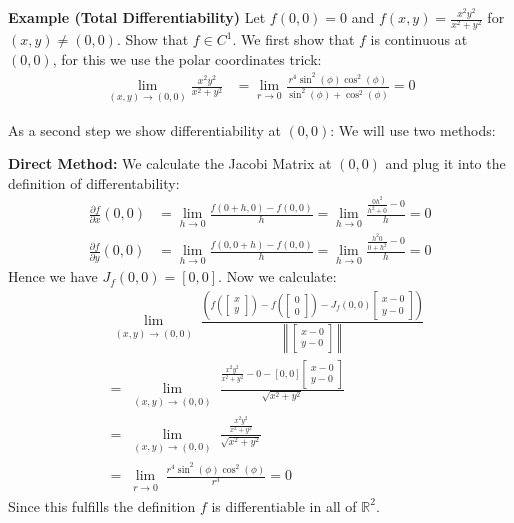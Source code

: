 \documentclass[25pt]{sciposter}
\newcommand{\R}{\mathbb{R}}
\newcommand{\norm}[1]{\left\lVert#1\right\rVert}
\newcommand{\TODO}[1]{\todo[inline]{\Large TODO:  #1}}
\begin{document}
\begin{multicols}{3}
\begin{itemize}
\end{itemize}
\TODO{...}


\textbf{Example (Total Differentiability)}
Let $f(0,0) = 0$ and $f(x,y) = \frac{x^2 y^2}{x^2+y^2}$ for $(x,y)\neq (0,0)$. Show that $f \in C^1$. We first show that $f$ is continuous at $(0,0)$, for this we use the polar coordinates trick:
\begin{align*}
	\lim\limits_{(x,y)\to(0,0)} \frac{x^2 y^2}{x^2+y^2} &= \lim\limits_{r\to 0} \frac{r^4 \sin^2(\phi)\cos^2(\phi)}{\sin^2(\phi) + \cos^2(\phi)} = 0
\end{align*}

As a second step we show differentiability at $(0,0)$: We will use two methods:

\textbf{Direct Method:}
We calculate the Jacobi Matrix at $(0,0)$ and plug it into the definition of differentability:
\begin{align*}
	\frac{\partial f}{\partial x}(0,0) &= \lim\limits_{h \to 0}\frac{f(0+h,0) -f(0,0)}{h} = \lim\limits_{h \to 0} \frac{\frac{0h^2}{h^2 + 0} - 0}{h} = 0\\
	\frac{\partial f}{\partial y}(0,0) &= \lim\limits_{h \to 0}\frac{f(0,0+h) -f(0,0)}{h} = \lim\limits_{h \to 0} \frac{\frac{h^2 0}{0+h^2} - 0}{h} = 0
\end{align*}
Hence we have $J_f (0,0) = \left[0,0\right]$. Now we calculate:
\begin{align*}
&\lim\limits_{\substack{(x,y)\to (0,0)}} \frac{\left(f\left(\begin{bmatrix}
	x \\ y
	\end{bmatrix}\right) -f\left(\begin{bmatrix}
	0 \\ 0
	\end{bmatrix}\right) - J_f(0,0)\begin{bmatrix}
	x-0 \\ y -0
	\end{bmatrix}\right)}{\norm{\begin{bmatrix}
		x -0 \\ y -0
		\end{bmatrix}}} \\
	&= \lim\limits_{\substack{(x,y)\to (0,0)}} \frac{\frac{x^2 y^2}{x^2 + y^2} - 0 - \left[0,0\right] \begin{bmatrix}
x-0 \\ y -0
\end{bmatrix}}{ \sqrt{x^2 + y^2} }\\
&= \lim\limits_{\substack{(x,y)\to (0,0)}} \frac{\frac{x^2 y^2}{x^2 + y^2}}{ \sqrt{x^2 + y^2} }\\
&=  \lim\limits_{\substack{r \to 0}} \frac{r^4 \sin^2(\phi) \cos^2(\phi) }{r^3} = 0
\end{align*}
Since this fulfills the definition $f$ is differentiable in all of $\R^2$.


\end{multicols}
\end{document}
